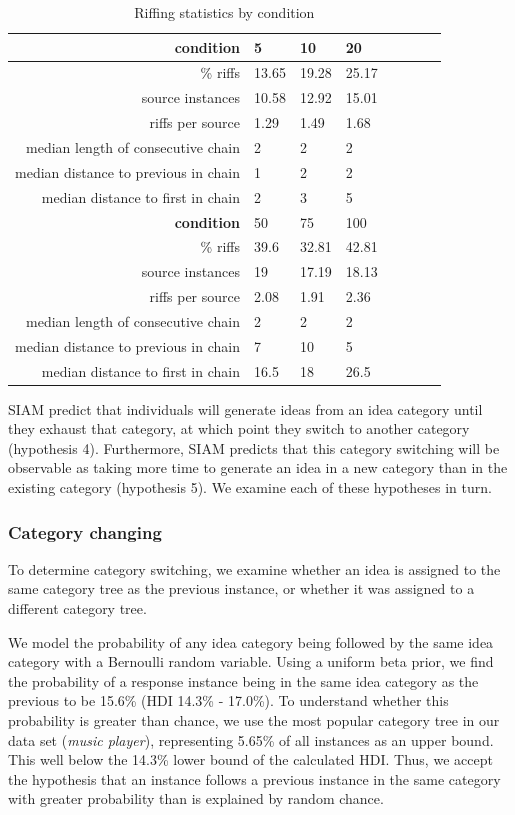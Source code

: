 \begin{table}
\begin{tabular}[h!]{r | l l l l l l l}
    \hline \hline \textbf{condition} & 5 & 10 & 20  \\ \hline \hline
    \% riffs & 13.65 & 19.28 & 25.17  \\
    source instances & 10.58 & 12.92 & 15.01 \\
    riffs per source & 1.29 & 1.49 & 1.68 \\
    median length of consecutive chain & 2 & 2 & 2 \\
    median distance to previous in chain & 1 & 2 & 2 \\
    median distance to first in chain & 2 & 3 & 5 \\ \hline \hline
    \textbf{condition} & 50 & 75 & 100 \\ \hline \hline
    \% riffs & 39.6 & 32.81 & 42.81 \\
    source instances & 19 & 17.19 & 18.13\\
    riffs per source & 2.08 & 1.91 & 2.36\\
    median length of consecutive chain & 2 & 2 & 2\\
    median distance to previous in chain & 7 & 10 & 5\\
    median distance to first in chain & 16.5 & 18 & 26.5 \\
    \end{tabular}
    \caption{Riffing statistics by condition}
    \label{tab:riffing}
\end{table}


SIAM predict that individuals will generate ideas from an idea category until they exhaust that category, at which point they switch to another category (hypothesis 4). Furthermore, SIAM predicts that this category switching will be observable as taking more time to generate an idea in a new category than in the existing category (hypothesis 5). We examine each of these hypotheses in turn.

\subsubsection{Category changing}

To determine category switching, we examine whether an idea is assigned to the same category tree as the previous instance, or whether it was assigned to a different category tree. 

We model the probability of any idea category being followed by the same idea category with a Bernoulli random variable. Using a uniform beta prior, we find the probability of a response instance being in the same idea category as the previous to be 15.6\% (HDI 14.3\% - 17.0\%). To understand whether this probability is greater than chance, we use the most popular category tree in our data set (\emph{music player}), representing 5.65\% of all instances as an upper bound. This well below the 14.3\% lower bound of the calculated HDI. Thus, we accept the hypothesis that an instance follows a previous instance in the same category with greater probability than is explained by random chance.

